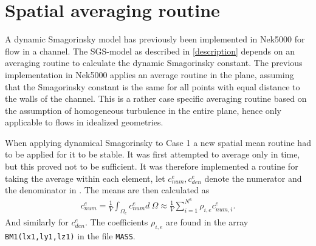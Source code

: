 \section{Spatial averaging routine}
A dynamic Smagorinsky model has previously been implemented in Nek5000 for flow in a channel. 
The SGS-model as described in \cref{description} depends on an averaging routine to calculate
the dynamic Smagorinsky constant. The previous implementation in Nek5000 applies an average routine in the plane,
assuming that the Smagorinsky constant is the same for all points with equal distance to the walls 
of the channel. This is a rather case specific averaging routine based on the assumption of homogeneous turbulence 
in the entire plane, hence only applicable to flows in idealized geometries.

When applying dynamical Smagorinsky to Case 1 a new spatial mean routine had to be applied for it to be stable. 
It was first attempted to average only in time, but this proved not to be sufficient. It was
therefore implemented a routine for taking the average within each element, let 
$c_{num}^e,c_{den}^e$ denote the numerator and the denominator in .
The means are then calculated as 
\begin{align}
    c_{num}^e = \frac{1}{V}\int_{\Omega_e}c_{num}^e d\: \Omega 
    \approx \frac{1}{V}\sum_{i = 1}^{N^3}\rho_{i,e}c_{num,i}^{e}.
    \label{eq:averageroutine}
\end{align}
And similarly for $c_{den}^e$.
The coefficients $\rho_{i,e}$ are found in the array \verb|BM1(lx1,ly1,lz1)| in the file 
\verb|MASS|.
